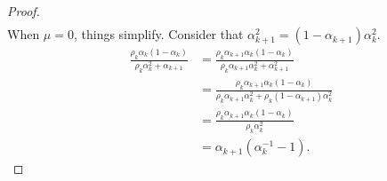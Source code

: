 \documentclass[12pt]{article}
\begin{document}
\begin{proof}
\begin{align*}
        \end{align*}
        When $\mu = 0$, things simplify. 
        Consider that $\alpha_{k +1}^2 = (1 - \alpha_{k + 1})\alpha_k^2$. 
        \begin{align*}
            \frac{\rho_k\alpha_k(1 - \alpha_k)}{\rho_k\alpha_k^2 + \alpha_{k + 1}}
            &= 
            \frac{\rho_k\alpha_{k + 1}\alpha_k(1 - \alpha_k)}
            {\rho_k\alpha_{k + 1}\alpha_k^2 + \alpha_{k + 1}^2}
            \\
            &= 
            \frac{\rho_k\alpha_{k + 1}\alpha_k(1 - \alpha_k)}
            {\rho_k\alpha_{k + 1}\alpha_k^2 + \rho_k(1 - \alpha_{k + 1})\alpha_k^2}
            \\
            &= \frac{\rho_k\alpha_{k + 1}\alpha_k(1 - \alpha_k)}{\rho_k\alpha_k^2}
            \\
            &= \alpha_{k + 1}(\alpha_k^{-1} - 1). 
        \end{align*}
    \end{proof}
\end{document}

